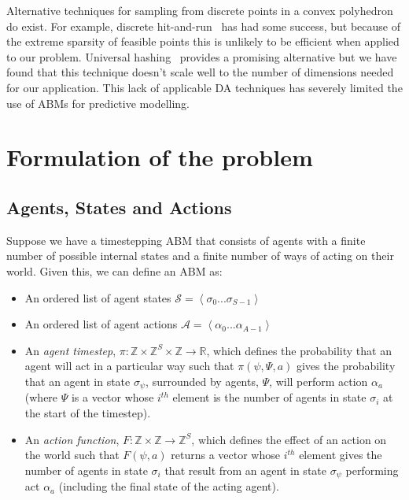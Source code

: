 \documentclass{article}
\begin{document}
Alternative techniques for sampling from discrete points in a convex polyhedron do exist. For example, discrete hit-and-run~\cite{baumert2009discrete} has had some success, but because of the extreme sparsity of feasible points this is unlikely to be efficient when applied to our problem. Universal hashing~\cite{meel2016constrained} provides a promising alternative but we have found that this technique doesn't scale well to the number of dimensions needed for our application. This lack of applicable DA techniques has severely limited the use of ABMs for predictive modelling.

\section{Formulation of the problem}

\subsection{Agents, States and Actions}
\label{abmdef}
Suppose we have a timestepping ABM that consists of agents with a finite number of possible internal states and a finite number of ways of acting on their world. Given this, we can define an ABM as:
\begin{itemize}
	\item An ordered list of agent states $\mathcal{S} = \left<\sigma_0 ... \sigma_{S-1}\right>$

	\item An ordered list of agent actions $\mathcal{A} =\left< \alpha_0 ... \alpha_{A-1} \right>$	
	
	\item An \textit{agent timestep}, $\pi : \mathbb{Z}\times\mathbb{Z}^S\times\mathbb{Z} \to \mathbb{R}$, which defines the probability that an agent will act in a particular way such that $\pi(\psi,\Psi,a)$ gives the probability that an agent in state $\sigma_\psi$, surrounded by agents, $\Psi$, will perform action $\alpha_a$ (where $\Psi$ is a vector whose $i^{th}$ element is the number of agents in state $\sigma_i$ at the start of the timestep).
	
	\item An \textit{action function}, $F: \mathbb{Z} \times \mathbb{Z} \to \mathbb{Z}^S$, which defines the effect of an action on the world such that $F(\psi, a)$ returns a vector whose $i^{th}$ element gives the number of agents in state $\sigma_i$ that result from an agent in state $\sigma_\psi$ performing act $\alpha_a$ (including the final state of the acting agent).
\end{itemize}
\end{document}
